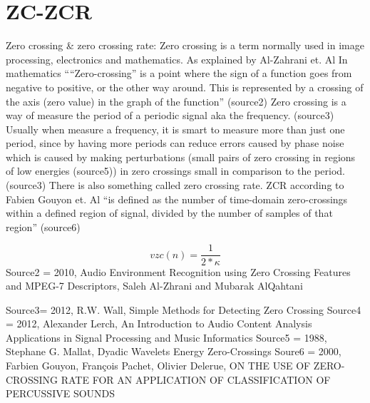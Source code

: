 \section{ZC-ZCR}


Zero crossing & zero crossing rate:
Zero crossing is a term normally used in image processing, electronics and mathematics. As explained by Al-Zahrani et. Al In mathematics ““Zero-crossing” is a point where the sign of a function goes from negative to positive, or the other way around. This is represented by a crossing of the axis (zero value) in the graph of the function” (source2) 
Zero crossing is a way of measure the period of a periodic signal aka the frequency. (source3) Usually when measure a frequency, it is smart to measure more than just one period, since by having more periods can reduce errors caused by phase noise which is caused by making perturbations (small pairs of zero crossing in regions of low energies (source5)) in zero crossings small in comparison to the period. (source3)
There is also something called zero crossing rate. ZCR according to Fabien Gouyon et. Al “is defined as the number of time-domain zero-crossings within a defined region of signal, divided by the number of samples of that region” (source6)




\begin{equation}\label{eq:ZCR}
vzc(n)= \frac{1}{2* \kappa}
\end{equation}
Source2 = 2010, Audio Environment Recognition using Zero Crossing Features and MPEG-7 Descriptors, Saleh Al-Zhrani and Mubarak AlQahtani

Source3= 2012, R.W. Wall, Simple Methods for Detecting Zero Crossing 
Source4 = 2012, Alexander Lerch, An Introduction to Audio Content Analysis Applications in Signal Processing and Music Informatics
Source5 = 1988, Stephane G. Mallat, Dyadic Wavelets Energy Zero-Crossings
Soure6 = 2000, Farbien Gouyon, François Pachet, Olivier Delerue, ON THE USE OF ZERO-CROSSING RATE FOR AN APPLICATION OF CLASSIFICATION OF PERCUSSIVE SOUNDS  



